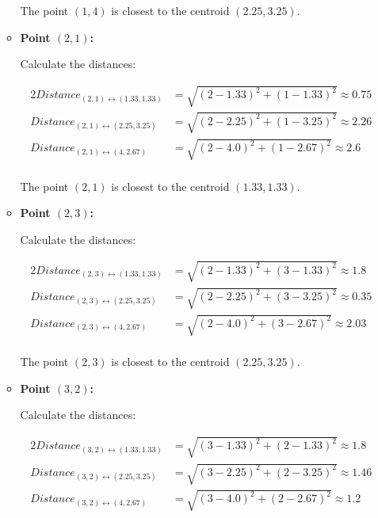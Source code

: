 \documentclass[
english,
smallborders
]{i6prcsht}
\begin{document}
\begin{solution}
\begin{enumerate}
\begin{itemize}
			            The point $(1,4)$ is closest to the centroid $(2.25,3.25)$.

			      \item \textbf{Point $(2,1)$:}

			            Calculate the distances:

			            \begin{alignat*}{2}
				            Distance_{(2,1)\leftrightarrow(1.33,1.33)} & = \sqrt{(2-1.33)^2+(1-1.33)^2} \approx 0.75 \\
				            Distance_{(2,1)\leftrightarrow(2.25,3.25)} & = \sqrt{(2-2.25)^2+(1-3.25)^2} \approx 2.26 \\
				            Distance_{(2,1)\leftrightarrow(4,2.67)}    & = \sqrt{(2-4.0)^2+(1-2.67)^2} \approx 2.6   \\
			            \end{alignat*}

			            The point $(2,1)$ is closest to the centroid $(1.33,1.33)$.

			      \item \textbf{Point $(2,3)$:}

			            Calculate the distances:

			            \begin{alignat*}{2}
				            Distance_{(2,3)\leftrightarrow(1.33,1.33)} & = \sqrt{(2-1.33)^2+(3-1.33)^2} \approx 1.8  \\
				            Distance_{(2,3)\leftrightarrow(2.25,3.25)} & = \sqrt{(2-2.25)^2+(3-3.25)^2} \approx 0.35 \\
				            Distance_{(2,3)\leftrightarrow(4,2.67)}    & = \sqrt{(2-4.0)^2+(3-2.67)^2} \approx 2.03  \\
			            \end{alignat*}

			            The point $(2,3)$ is closest to the centroid $(2.25,3.25)$.

			      \item \textbf{Point $(3,2)$:}

			            Calculate the distances:

			            \begin{alignat*}{2}
				            Distance_{(3,2)\leftrightarrow(1.33,1.33)} & = \sqrt{(3-1.33)^2+(2-1.33)^2} \approx 1.8  \\
				            Distance_{(3,2)\leftrightarrow(2.25,3.25)} & = \sqrt{(3-2.25)^2+(2-3.25)^2} \approx 1.46 \\
				            Distance_{(3,2)\leftrightarrow(4,2.67)}    & = \sqrt{(3-4.0)^2+(2-2.67)^2} \approx 1.2   \\
			            \end{alignat*}


\end{itemize}
\end{enumerate}
\end{solution}
\end{document}
